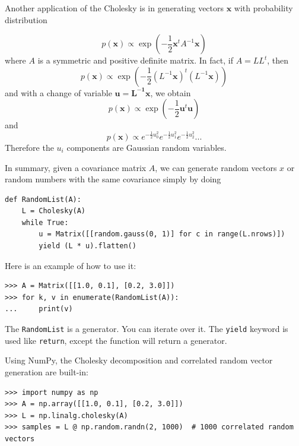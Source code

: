\documentclass[justified, sixbynine]{tufte-book}
\def\ft{\small\tt}
\theoremstyle{plain}%
\newtheorem * {corollary}{Corollary}
\theoremstyle{definition}
\theoremstyle{remark}
\newtheorem * {remark}{Remark}
\newtheorem * {note}{Note}
\begin{document}
\begin{fullwidth}
Another application of the Cholesky is in generating vectors $\mathbf{x}$ with probability distribution

\begin{equation}
p(\mathbf{x}) \propto \exp\left(-\frac12 \mathbf{x}^t A^{-1} \mathbf{x}\right)
\end{equation}
where $A$ is a symmetric and positive definite matrix. In fact, if $A=LL^t$, then
\begin{equation}
p(\mathbf{x}) \propto \exp\left(-\frac12 (L^{-1}\mathbf{x})^t (L^{-1}\mathbf{x})\right)
\end{equation}
and with a change of variable $\mathbf{u}=\mathbf{L^{-1}x}$, we obtain
\begin{equation}
p(\mathbf{x}) \propto \exp\left(-\frac12 \mathbf{u}^t \mathbf{u}\right)
\end{equation}
and
\begin{equation}
p(\mathbf{x}) \propto e^{-\frac12 u_0^2}e^{-\frac12 u_1^2}e^{-\frac12 u_2^2}...
\end{equation}
Therefore the $u_i$ components are Gaussian random variables.

In summary, given a covariance matrix $A$, we can generate random vectors $x$ or random numbers with the same covariance simply by doing

\begin{lstlisting}
def RandomList(A):
    L = Cholesky(A)
    while True:
        u = Matrix([[random.gauss(0, 1)] for c in range(L.nrows)])
        yield (L * u).flatten()
\end{lstlisting}

Here is an example of how to use it:

\begin{lstlisting}
>>> A = Matrix([[1.0, 0.1], [0.2, 3.0]])
>>> for k, v in enumerate(RandomList(A)):
...     print(v)
\end{lstlisting}

The {\ft RandomList} is a generator. You can iterate over it. The {\ft yield} keyword is used like {\ft return}, except the function will return a generator.

Using NumPy, the Cholesky decomposition and correlated random vector generation are built-in:

\begin{lstlisting}
>>> import numpy as np
>>> A = np.array([[1.0, 0.1], [0.2, 3.0]])
>>> L = np.linalg.cholesky(A)
>>> samples = L @ np.random.randn(2, 1000)  # 1000 correlated random vectors
\end{lstlisting}


\end{fullwidth}
\end{document}
